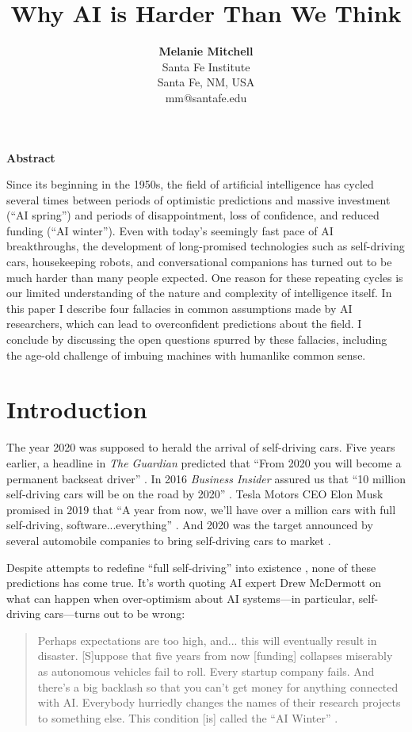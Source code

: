 \documentclass[12pt]{article}
\title{\textbf{Why AI is Harder Than We Think}}
\author{\textbf{Melanie Mitchell} \\ \normalsize Santa Fe Institute \\ Santa Fe, NM, USA \\ mm@santafe.edu \\
}
\date{}
\begin{document}
\maketitle

\begin{center} \textbf{Abstract} \end{center}
Since its beginning in the 1950s, the field of artificial intelligence has cycled several times between periods of optimistic predictions and massive investment (``AI spring'') and periods of disappointment, loss of confidence, and reduced funding (``AI winter''). Even with today’s seemingly fast pace of AI breakthroughs, the development of long-promised technologies such as self-driving cars, housekeeping robots, and conversational companions has turned out to be much harder than many people expected. One reason for these repeating cycles is our limited understanding of the nature and complexity of intelligence itself. In this paper I describe four fallacies in common assumptions made by AI researchers, which can lead to overconfident predictions about the field. I conclude by discussing the open questions spurred by these fallacies, including the age-old challenge of imbuing machines with humanlike common sense.

\section*{Introduction}
The year 2020 was supposed to herald the arrival of self-driving cars.  Five years earlier, a headline in \textit{The Guardian} predicted that ``From 2020 you will become a permanent backseat driver'' \cite{Guardian2015}. In 2016 \textit{Business Insider} assured us that ``10 million self-driving cars will be on the road by 2020'' \cite{BusinessInsider2016}.  Tesla Motors CEO Elon Musk promised in 2019 that ``A year from now, we'll have over a million cars with full self-driving, software...everything'' \cite{Verge2019}. And 2020 was the target announced by several automobile companies to bring self-driving cars to market \cite{Verge2017,PhysOrg2015,Toyota2020}.

Despite attempts to redefine ``full self-driving'' into existence \cite{CarAndDriver2021}, none of these predictions has come true.  It's worth quoting AI expert Drew McDermott on what can happen when over-optimism about AI systems---in particular, self-driving cars---turns out to be wrong:
\begin{quote}
   Perhaps expectations are too high, and... this will eventually result in disaster. [S]uppose that five years from now [funding] collapses miserably as autonomous vehicles fail to roll.  Every startup company fails. And there's a big backlash so that you can't get money for anything connected with AI. Everybody hurriedly changes the names of their research projects to something else. This condition [is] called the ``AI Winter'' \cite{McDermott1985}.
\end{quote}
\end{document}
